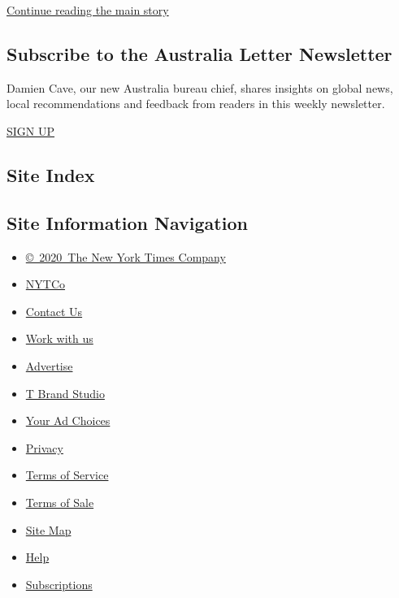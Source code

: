 \protect\hyperlink{after-mktg}{Continue reading the main story}

\hypertarget{subscribe-to-the-australia-letter-newsletter}{%
\subsection{Subscribe to the Australia Letter
Newsletter}\label{subscribe-to-the-australia-letter-newsletter}}

Damien Cave, our new Australia bureau chief, shares insights on global
news, local recommendations and feedback from readers in this weekly
newsletter.

\href{/newsletters/signup/AUST}{SIGN UP}

\hypertarget{site-index}{%
\subsection{Site Index}\label{site-index}}

\hypertarget{site-information-navigation}{%
\subsection{Site Information
Navigation}\label{site-information-navigation}}

\begin{itemize}
\tightlist
\item
  \href{https://help.nytimes3xbfgragh.onion/hc/en-us/articles/115014792127-Copyright-notice}{©~2020~The
  New York Times Company}
\end{itemize}

\begin{itemize}
\tightlist
\item
  \href{https://www.nytco.com/}{NYTCo}
\item
  \href{https://help.nytimes3xbfgragh.onion/hc/en-us/articles/115015385887-Contact-Us}{Contact
  Us}
\item
  \href{https://www.nytco.com/careers/}{Work with us}
\item
  \href{https://nytmediakit.com/}{Advertise}
\item
  \href{http://www.tbrandstudio.com/}{T Brand Studio}
\item
  \href{https://www.nytimes3xbfgragh.onion/privacy/cookie-policy\#how-do-i-manage-trackers}{Your
  Ad Choices}
\item
  \href{https://www.nytimes3xbfgragh.onion/privacy}{Privacy}
\item
  \href{https://help.nytimes3xbfgragh.onion/hc/en-us/articles/115014893428-Terms-of-service}{Terms
  of Service}
\item
  \href{https://help.nytimes3xbfgragh.onion/hc/en-us/articles/115014893968-Terms-of-sale}{Terms
  of Sale}
\item
  \href{https://spiderbites.nytimes3xbfgragh.onion}{Site Map}
\item
  \href{https://help.nytimes3xbfgragh.onion/hc/en-us}{Help}
\item
  \href{https://www.nytimes3xbfgragh.onion/subscription?campaignId=37WXW}{Subscriptions}
\end{itemize}
